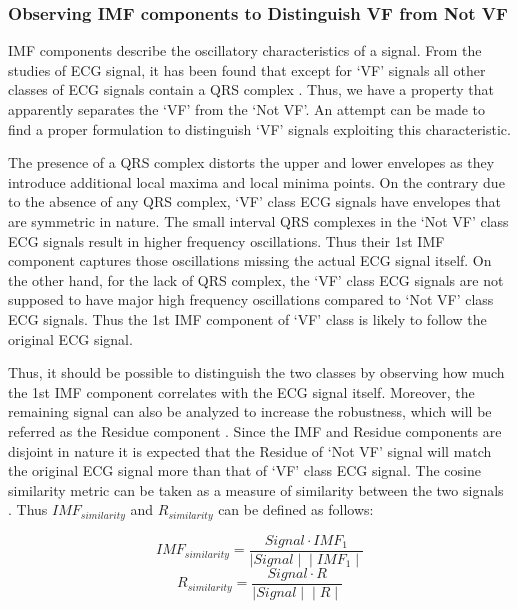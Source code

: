 \documentclass[12pt,a4paper]{article}
\begin{document}
\subsubsection{Observing IMF components to Distinguish VF from Not VF}

IMF components describe the oscillatory characteristics of a signal. From the studies of ECG signal, it has been found that except for `VF' signals all other classes of ECG signals contain a QRS complex \cite{jones2009ecg}. Thus, we have a property that apparently separates the `VF' from the `Not VF'. An attempt can be made to find a proper formulation to distinguish `VF' signals exploiting this characteristic.

The presence of a QRS complex distorts the upper and lower envelopes as they introduce additional local maxima and local minima points. On the contrary due to the absence of any QRS complex, `VF' class ECG signals have envelopes that are symmetric in nature. The small interval QRS complexes in the `Not VF' class ECG signals result in higher frequency oscillations. Thus their 1st IMF component captures those oscillations missing the actual ECG signal itself. On the other hand, for the lack of QRS complex, the `VF' class ECG signals are not supposed to have major high frequency oscillations compared to `Not VF' class ECG signals. Thus the 1st IMF component of `VF' class is likely to follow the original ECG signal.

Thus, it should be possible to distinguish the two classes by observing how much the 1st IMF component correlates with the ECG signal itself. Moreover, the remaining signal can also be analyzed to increase the robustness, which will be referred as the Residue component \cite{anas2011exploiting}. Since the IMF and Residue components are disjoint in nature it is expected that the Residue of `Not VF' signal will match the original ECG signal more than that of `VF' class ECG signal. The cosine similarity metric can be taken as a measure of similarity between the two signals \cite{anas2011exploiting}. Thus $IMF_{similarity}$ and $R_{similarity}$ can be defined as follows:

\begin{equation}
IMF_{similarity}= \frac{Signal \cdot IMF_1}{\mid Signal \mid \text{} \mid IMF_1 \mid}
\end{equation}
\begin{equation}
R_{similarity}= \frac{Signal \cdot R}{\mid Signal \mid \text{} \mid R \mid}
\end{equation}
\end{document}
